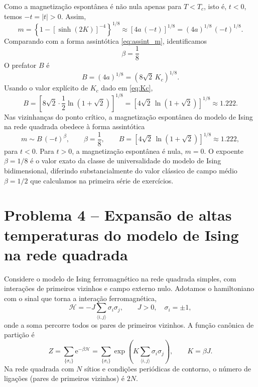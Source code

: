 \documentclass[11pt,a4paper]{article}
\newcommand{\e}[1]{\mathrm{e}^{#1}}
\begin{document}
%
Como a magnetização espontânea é não nula apenas para \(T < T_c\), isto é,
\(t < 0\), temos \(-t = |t| > 0\). Assim,
%
\begin{equation}
    m = \left\{1 - \left[\sinh(2K)\right]^{-4}\right\}^{1/8}
    \approx \left[4a\,(-t)\right]^{1/8}
    = (4a)^{1/8}\,(-t)^{1/8}.
    \label{eq:m_scaling}
\end{equation}
%
Comparando com a forma assintótica \eqref{eq:assint_m}, identificamos
%
\begin{equation}
    \boxed{
    \beta = \frac{1}{8}
    }
    \label{eq:beta_onsager}
\end{equation}
%
O prefator \(B\) é
%
\begin{equation}
    B = (4a)^{1/8} = \left(8\sqrt{2}\,K_c\right)^{1/8}.
    \label{eq:B_Kc}
\end{equation}
%
Usando o valor explícito de \(K_c\) dado em \eqref{eq:Kc},
%
\begin{equation}
    \boxed{
    B = \left[8\sqrt{2}\cdot \frac{1}{2}\ln(1+\sqrt{2})\right]^{1/8}
    = \left[4\sqrt{2}\,\ln(1+\sqrt{2})\right]^{1/8}
    \approx 1.222.
    }
    \label{eq:B_final}
\end{equation}
%
Nas vizinhanças do ponto crítico, a magnetização espontânea do modelo de Ising na rede quadrada obedece à forma assintótica
%
\begin{equation}
    \boxed{
    m \sim B\,(-t)^{\beta},
    \qquad
    \beta = \frac{1}{8},
    \qquad
    B = \left[4\sqrt{2}\,\ln(1+\sqrt{2})\right]^{1/8} \approx 1.222,
    }
    \label{eq:resultado_final}
\end{equation}
%
para \(t < 0\). Para \(t > 0\), a magnetização espontânea é nula, \(m = 0\). O expoente \(\beta = 1/8\) é o valor exato da classe de universalidade do modelo de Ising bidimensional, diferindo substancialmente do valor clássico de campo médio \(\beta = 1/2\) que calculamos na primeira série de exercícios.
\section*{Problema 4 -- Expansão de altas temperaturas do modelo de Ising na rede quadrada}
% 
Considere o modelo de Ising ferromagnético na rede quadrada simples, com interações de primeiros vizinhos e campo externo nulo. Adotamos o hamiltoniano
com o sinal que torna a interação ferromagnética,
%
\begin{equation}
    \mathcal H = -J \sum_{\langle i,j\rangle} \sigma_i \sigma_j,
    \qquad J>0,\quad \sigma_i=\pm1,
    \label{eq:H_ising_square}
\end{equation}
%
onde a soma percorre todos os pares de primeiros vizinhos. A função canônica de partição é
%
\begin{equation}
    Z = \sum_{\{\sigma_i\}} \e{-\beta \mathcal H}
    = \sum_{\{\sigma_i\}} \exp\left(K \sum_{\langle i,j\rangle} \sigma_i \sigma_j\right),
    \qquad K=\beta J.
    \label{eq:Z_def}
\end{equation}
%
Na rede quadrada com $N$ sítios e condições periódicas de contorno, o número de
ligações (pares de primeiros vizinhos) é $2N$.
\end{document}
